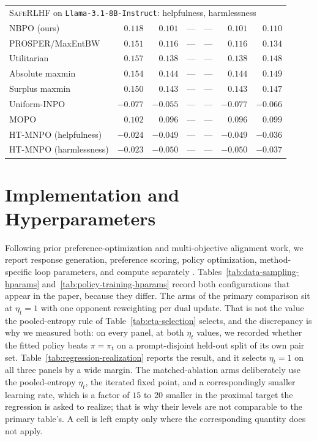 \documentclass{article}
\theoremstyle{remark}
\theoremstyle{plain}
\newcommand{\NBPO}{\textsc{NBPO}}
\begin{document}
\begin{table}[t]
\begin{tabular}{lrrrrrr}
\midrule
\multicolumn{7}{l}{\textsc{SafeRLHF} on \texttt{Llama-3.1-8B-Instruct}: helpfulness, harmlessness}\\
\NBPO{} (ours) & $0.118$ & $0.101$ & --- & --- & $0.101$ & $0.110$\\
PROSPER/MaxEntBW & $0.151$ & $0.116$ & --- & --- & $0.116$ & $0.134$\\
Utilitarian & $0.157$ & $0.138$ & --- & --- & $0.138$ & $0.148$\\
Absolute maxmin & $0.154$ & $0.144$ & --- & --- & $0.144$ & $0.149$\\
Surplus maxmin & $0.150$ & $0.143$ & --- & --- & $0.143$ & $0.147$\\
Uniform-INPO & $-0.077$ & $-0.055$ & --- & --- & $-0.077$ & $-0.066$\\
MOPO & $0.102$ & $0.096$ & --- & --- & $0.096$ & $0.099$\\
HT-MNPO (helpfulness) & $-0.024$ & $-0.049$ & --- & --- & $-0.049$ & $-0.036$\\
HT-MNPO (harmlessness) & $-0.023$ & $-0.050$ & --- & --- & $-0.050$ & $-0.037$\\
\bottomrule
\end{tabular}
\end{table}

\section{Implementation and Hyperparameters}
\label{app:hyperparameters}
Following prior preference-optimization and multi-objective alignment work, we report response generation, preference scoring, policy optimization, method-specific loop parameters, and compute separately \citep{munos2024nash,zhang2025iterative,zhong2024panacea,zhang2026prosper}. Tables~\ref{tab:data-sampling-hparams} and~\ref{tab:policy-training-hparams} record both configurations that appear in the paper, because they differ. The arms of the primary comparison sit at $\eta_t=1$ with one opponent reweighting per dual update. That is not the value the pooled-entropy rule of Table~\ref{tab:eta-selection} selects, and the discrepancy is why we measured both: on every panel, at both $\eta_t$ values, we recorded whether the fitted policy beats $\pi=\pi_t$ on a prompt-disjoint held-out split of its own pair set. Table~\ref{tab:regression-realization} reports the result, and it selects $\eta_t=1$ on all three panels by a wide margin. The matched-ablation arms deliberately use the pooled-entropy $\eta_t$, the iterated fixed point, and a correspondingly smaller learning rate, which is a factor of $15$ to $20$ smaller in the proximal target the regression is asked to realize; that is why their levels are not comparable to the primary table's. A cell is left empty only where the corresponding quantity does not apply.
\end{document}
